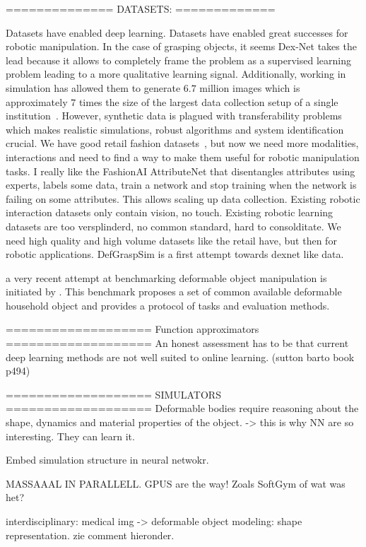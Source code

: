 \documentclass[\home/main.tex]{subfiles}
\begin{document}
==============
DATASETS:
=============

Datasets have enabled deep learning. Datasets have enabled great successes for robotic manipulation. In the case of grasping objects, it seems Dex-Net takes the lead because it allows to completely frame the problem as a supervised learning problem leading to a more qualitative learning signal. Additionally, working in simulation has allowed them to generate $6.7$ million images which is approximately $7$ times the size of the largest data collection setup of a single institution~\autocite{Levine2016}. However, synthetic data is plagued with transferability problems which makes realistic simulations, robust algorithms and system identification crucial. 
We have good retail fashion datasets~\autocite{DeepFashion, DeepFashion2, FashionAI}, but now we need more modalities, interactions and need to find a way to make them useful for robotic manipulation tasks. 
I really like the FashionAI AttributeNet that disentangles attributes using experts, labels some data, train a network and stop training when the network is failing on some attributes. This allows scaling up data collection.
Existing robotic interaction datasets only contain vision, no touch. 
Existing robotic learning datasets are too versplinderd, no common standard, hard to consolditate. 
We need high quality and high volume datasets like the retail have, but then for robotic applications. 
DefGraspSim is a first attempt towards dexnet like data.

a very recent attempt at benchmarking deformable object manipulation is initiated by \autocite{garciacamacho2021household}. This benchmark proposes a set of common available deformable household object and provides a protocol of tasks and evaluation methods.

===================
Function approximators 
===================
An honest assessment has to be that current deep learning methods are not well suited to online learning. (sutton barto book p494)

===================
SIMULATORS 
===================
Deformable bodies require reasoning about the shape, dynamics and material properties of the object. -> this is why NN are so interesting. They can learn it.

Embed simulation structure in neural netwokr. 

MASSAAAL IN PARALLELL. GPUS are the way! Zoals SoftGym of wat was het?

interdisciplinary: medical img -> deformable object modeling: shape representation. zie comment hieronder.
\end{document}

